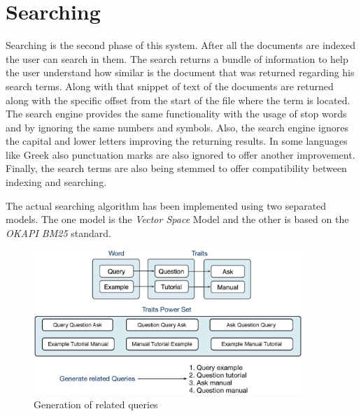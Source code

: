 \documentclass[letterpaper,10pt]{article}
\begin{document}
\section{Searching}
Searching is the second phase of this system. After all the documents are indexed the user can search in them. The search returns a bundle of information to help the user understand how similar is the document that was returned regarding his search terms. Along with that snippet of text of the documents are returned along with the specific offset from the start of the file where the term is located. The search engine provides the same functionality with the usage of stop words and by ignoring the same numbers and symbols. Also, the search engine ignores the capital and lower letters improving the returning results. In some languages like Greek also punctuation marks are also ignored to offer another improvement. Finally, the search terms are also being stemmed to offer compatibility between indexing and searching.

The actual searching algorithm has been implemented using two separated models. The one model is the \emph{ Vector Space} Model and the other is based on the \emph{ OKAPI BM25} standard.

\begin{figure}
    \centering
    \includegraphics[width=4.0in]{RelatedQuery.eps}
    \caption{Generation of related queries}
    \label{Generation of related queries}
\end{figure}
\end{document}
